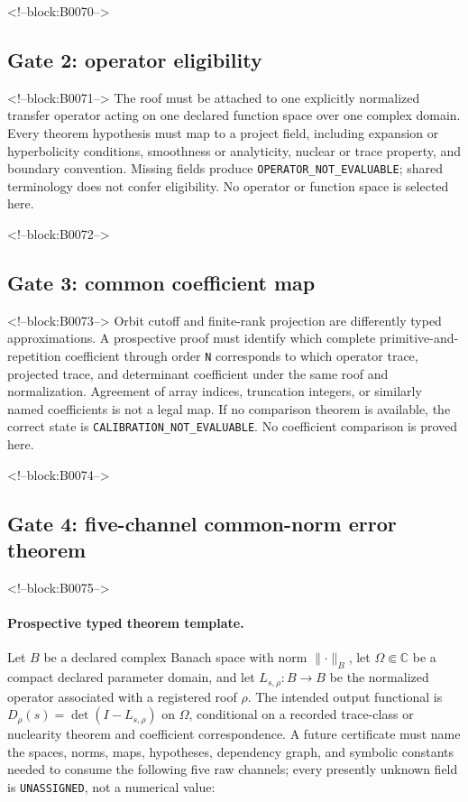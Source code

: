 \documentclass[11pt,a4paper]{article}
\begin{document}
<!--block:B0070-->
\subsection{Gate 2: operator eligibility}

<!--block:B0071-->
The roof must be attached to one explicitly normalized transfer operator acting on one declared function space over one complex domain. Every theorem hypothesis must map to a project field, including expansion or hyperbolicity conditions, smoothness or analyticity, nuclear or trace property, and boundary convention. Missing fields produce \texttt{OPERATOR\_NOT\_EVALUABLE}; shared terminology does not confer eligibility. No operator or function space is selected here.

<!--block:B0072-->
\subsection{Gate 3: common coefficient map}

<!--block:B0073-->
Orbit cutoff and finite-rank projection are differently typed approximations. A prospective proof must identify which complete primitive-and-repetition coefficient through order \texttt{N} corresponds to which operator trace, projected trace, and determinant coefficient under the same roof and normalization. Agreement of array indices, truncation integers, or similarly named coefficients is not a legal map. If no comparison theorem is available, the correct state is \texttt{CALIBRATION\_NOT\_EVALUABLE}. No coefficient comparison is proved here.

<!--block:B0074-->
\subsection{Gate 4: five-channel common-norm error theorem}

<!--block:B0075-->
\paragraph{Prospective typed theorem template.} Let \(B\) be a declared complex Banach space with norm \(\lVert\cdot\rVert_B\), let \(\Omega\Subset\mathbb{C}\) be a compact declared parameter domain, and let \(L_{s,\rho}:B\to B\) be the normalized operator associated with a registered roof \(\rho\). The intended output functional is \(D_\rho(s)=\det(I-L_{s,\rho})\) on \(\Omega\), conditional on a recorded trace-class or nuclearity theorem and coefficient correspondence. A future certificate must name the spaces, norms, maps, hypotheses, dependency graph, and symbolic constants needed to consume the following five raw channels; every presently unknown field is \texttt{UNASSIGNED}, not a numerical value:
\end{document}
